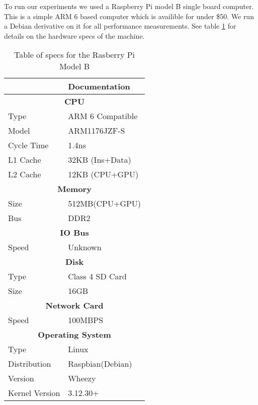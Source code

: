 To run our experiments we used a Raspberry Pi model B single board computer.   
This is a simple ARM 6 based computer which is availible for under \$50.
We run a Debian derivative on it for all performance measurements.
See table \ref{tbl:specs} for details on the hardware specs of the machine.

\begin{table}[h]
\label{tbl:specs}
\centering
\begin{tabular}{|l|l|}
\hline
                     & Documentation            \\ \hline
\multicolumn{2}{|c|}{\textbf{CPU}}              \\ \hline
Type                 & ARM 6 Compatible         \\ \hline
Model                & ARM1176JZF-S             \\ \hline
Cycle Time           & 1.4ns                    \\ \hline
L1 Cache             & 32KB (Ins+Data)          \\ \hline
L2 Cache             & 12KB (CPU+GPU)           \\ \hline
\multicolumn{2}{|c|}{\textbf{Memory}}           \\ \hline
Size                 & 512MB(CPU+GPU)           \\ \hline
Bus                  & DDR2                     \\ \hline
\multicolumn{2}{|c|}{\textbf{IO Bus}}           \\ \hline
Speed                & Unknown                  \\ \hline
\multicolumn{2}{|c|}{\textbf{Disk}}             \\ \hline
Type                 & Class 4 SD Card          \\ \hline
Size                 & 16GB                     \\ \hline
\multicolumn{2}{|c|}{\textbf{Network Card}}     \\ \hline
Speed                & 100MBPS                  \\ \hline
\multicolumn{2}{|c|}{\textbf{Operating System}} \\ \hline
Type                 & Linux                    \\ \hline
Distribution       & Raspbian(Debian)\\ \hline
Version             & Wheezy\\ \hline
Kernel Version  & 3.12.30+ \\\hline
\end{tabular}
\caption{Table of specs for the Rasberry Pi Model B\cite{infosheet}\cite{rpicomp}\cite{elinux}}
\end{table}